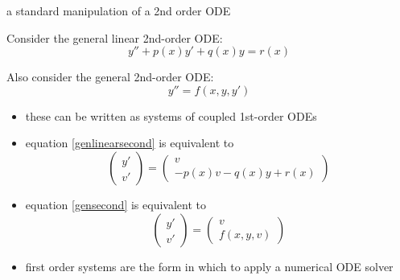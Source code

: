\documentclass[10pt,hyperref]{beamer}
\begin{document}
\begin{frame}{a standard manipulation of a 2nd order ODE} 

Consider the general linear 2nd-order ODE:
\begin{equation}\label{genlinearsecond}
y'' + p(x) y' + q(x) y = r(x)
\end{equation}

Also consider the general 2nd-order ODE:
\begin{equation}\label{gensecond}
y'' = f(x,y,y')
\end{equation}

\begin{itemize}
\item \alert{these can be written as systems of coupled 1st-order ODEs}
\item equation \eqref{genlinearsecond} is equivalent to
	$$\begin{pmatrix}
	y' \\ v'
	\end{pmatrix} = \begin{pmatrix}
	v \\ - p(x) v - q(x) y + r(x)
	\end{pmatrix}$$
\item equation \eqref{gensecond} is equivalent to
	$$\begin{pmatrix}
	y' \\ v'
	\end{pmatrix} = \begin{pmatrix}
	v \\ f(x,y,v)
	\end{pmatrix}$$
\item first order systems are the form in which to apply a numerical ODE solver
\end{itemize}
\end{frame}
\end{document}
